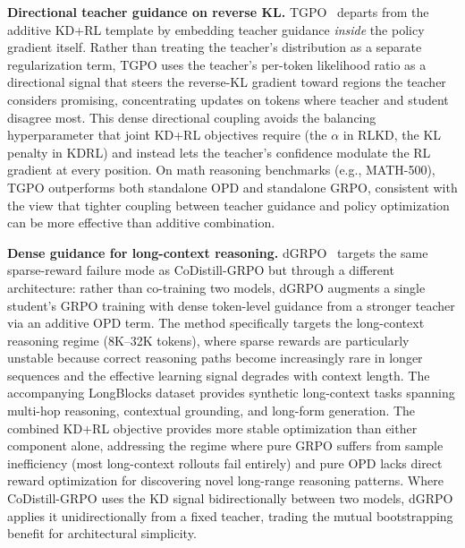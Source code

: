 \documentclass{article} %
\begin{document}
\textbf{Directional teacher guidance on reverse KL.} TGPO~\citep{2605.13230} departs from the additive KD+RL template by embedding teacher guidance \emph{inside} the policy gradient itself. Rather than treating the teacher's distribution as a separate regularization term, TGPO uses the teacher's per-token likelihood ratio as a directional signal that steers the reverse-KL gradient toward regions the teacher considers promising, concentrating updates on tokens where teacher and student disagree most. This dense directional coupling avoids the balancing hyperparameter that joint KD+RL objectives require (the $\alpha$ in RLKD, the KL penalty in KDRL) and instead lets the teacher's confidence modulate the RL gradient at every position. On math reasoning benchmarks (e.g., MATH-500), TGPO outperforms both standalone OPD and standalone GRPO, consistent with the view that tighter coupling between teacher guidance and policy optimization can be more effective than additive combination.

\textbf{Dense guidance for long-context reasoning.} dGRPO~\citep{2605.12227} targets the same sparse-reward failure mode as CoDistill-GRPO but through a different architecture: rather than co-training two models, dGRPO augments a single student's GRPO training with dense token-level guidance from a stronger teacher via an additive OPD term. The method specifically targets the long-context reasoning regime (8K--32K tokens), where sparse rewards are particularly unstable because correct reasoning paths become increasingly rare in longer sequences and the effective learning signal degrades with context length. The accompanying LongBlocks dataset provides synthetic long-context tasks spanning multi-hop reasoning, contextual grounding, and long-form generation. The combined KD+RL objective provides more stable optimization than either component alone, addressing the regime where pure GRPO suffers from sample inefficiency (most long-context rollouts fail entirely) and pure OPD lacks direct reward optimization for discovering novel long-range reasoning patterns. Where CoDistill-GRPO uses the KD signal bidirectionally between two models, dGRPO applies it unidirectionally from a fixed teacher, trading the mutual bootstrapping benefit for architectural simplicity.
\end{document}

